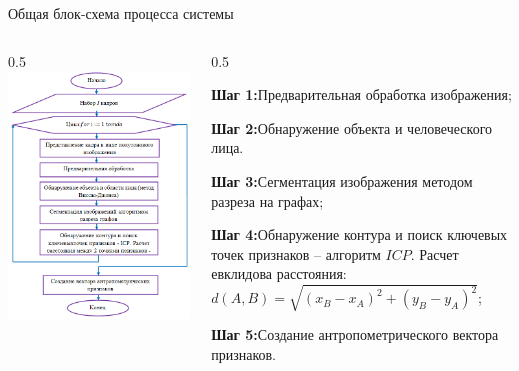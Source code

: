 \documentclass[10pt,pdf,hyperref={unicode},xcolor=table]{beamer}
\begin{document}
\begin{frame}{Общая блок-схема процесса системы}		
\begin{columns}
		\begin{column} {0.5\textwidth}			
			\includegraphics[width=1\linewidth]{p7}
			\end{column}
			\begin{column} {0.5\textwidth}
			\begin{block}{}
	\textbf{Шаг 1:}Предварительная обработка изображения;
	\end{block}
				\begin{block}{}
\textbf{Шаг 2:}Обнаружение объекта и человеческого лица.
\end{block}
\begin{block}{}
	 \textbf{Шаг 3:}Сегментация изображения методом разреза на графах;
\end{block}
\begin{block}{}
	\textbf{Шаг 4:}Обнаружение контура и поиск ключевых точек признаков – алгоритм $ICP$. Расчет евклидова расстояния: $d\left(A,B\right) = \sqrt{\left(x_B - x_A\right)^2 + \left(y_B - y_A\right)^2}$;
	\end{block}
	\begin{block}{}
	\textbf{Шаг 5:}Создание антропометрического вектора признаков.
\end{block}
			\end{column}      
		\end{columns}	
\end{frame}
\end{document}
